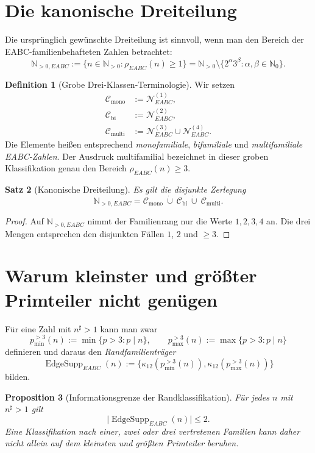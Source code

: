 \documentclass[11pt,a4paper,reqno]{amsart}
\newtheorem{theorem}{Satz}[section]
\newtheorem{proposition}[theorem]{Proposition}
\theoremstyle{definition}
\newtheorem{definition}[theorem]{Definition}
\theoremstyle{remark}
\newcommand{\Npos}{\mathbb{N}_{>0}}
\newcommand{\rankE}{\rho_{EABC}}
\newcommand{\dotcupsmall}{\mathbin{\dot\cup}}
\begin{document}
\section{Die kanonische Dreiteilung}

Die ursprünglich gewünschte Dreiteilung ist sinnvoll, wenn man den Bereich der EABC-familienbehafteten Zahlen betrachtet:
\[
\mathbb{N}_{>0,EABC}
:=\{n\in\Npos:\rankE(n)\ge 1\}
=\Npos\setminus\{2^\alpha3^\beta:\alpha,\beta\in\mathbb N_0\}.
\]

\begin{definition}[Grobe Drei-Klassen-Terminologie]
Wir setzen
\begin{align*}
\mathcal C_{\mathrm{mono}}&:=\mathcal N^{(1)}_{EABC},\\
\mathcal C_{\mathrm{bi}}&:=\mathcal N^{(2)}_{EABC},\\
\mathcal C_{\mathrm{multi}}&:=\mathcal N^{(3)}_{EABC}\cup\mathcal N^{(4)}_{EABC}.
\end{align*}
Die Elemente heißen entsprechend \emph{monofamiliale}, \emph{bifamiliale} und \emph{multifamiliale EABC-Zahlen}. Der Ausdruck multifamilial bezeichnet in dieser groben Klassifikation genau den Bereich $\rankE(n)\ge3$.
\end{definition}

\begin{theorem}[Kanonische Dreiteilung]
Es gilt die disjunkte Zerlegung
\[
\mathbb{N}_{>0,EABC}
=\mathcal C_{\mathrm{mono}}\ \dotcupsmall\
 \mathcal C_{\mathrm{bi}}\ \dotcupsmall\
 \mathcal C_{\mathrm{multi}}.
\]
\end{theorem}

\begin{proof}
Auf $\mathbb{N}_{>0,EABC}$ nimmt der Familienrang nur die Werte $1,2,3,4$ an. Die drei Mengen entsprechen den disjunkten Fällen $1$, $2$ und $\ge3$.
\end{proof}

\section{Warum kleinster und größter Primteiler nicht genügen}

Für eine Zahl mit $n^{\sharp}>1$ kann man zwar
\[
p_{\min}^{>3}(n):=\min\{p>3:p\mid n\},\qquad
p_{\max}^{>3}(n):=\max\{p>3:p\mid n\}
\]
definieren und daraus den \emph{Randfamilienträger}
\[
\operatorname{EdgeSupp}_{EABC}(n)
:=\bigl\{\kappa_{12}(p_{\min}^{>3}(n)),
          \kappa_{12}(p_{\max}^{>3}(n))\bigr\}
\]
bilden.

\begin{proposition}[Informationsgrenze der Randklassifikation]
Für jedes $n$ mit $n^{\sharp}>1$ gilt
\[
\bigl|\operatorname{EdgeSupp}_{EABC}(n)\bigr|\le2.
\]
Eine Klassifikation nach einer, zwei oder drei vertretenen Familien kann daher nicht allein auf dem kleinsten und größten Primteiler beruhen.
\end{proposition}
\end{document}
